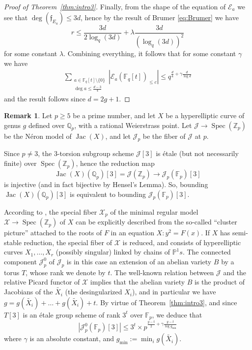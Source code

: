 \documentclass[11pt]{article}
\newcommand{\Z}{\ensuremath{\mathbb{Z}}}
\newcommand{\Q}{\ensuremath{\mathbb{Q}}}
\newcommand{\F}{\ensuremath{\mathbb{F}}}
\theoremstyle{plain}
\theoremstyle{definition}
\newtheorem{remark}[theorem]{Remark}
\DeclareMathOperator{\Spec}{Spec}
\DeclareMathOperator{\Jac}{Jac}
\newcommand{\PP}{\mathbb{P}}
\begin{document}
\begin{proof}[Proof of Theorem~\ref{thm:intro3}]
Finally, from the shape of the equation of $\mathcal{E}_a$ we see that $\deg(\mathfrak{f}_{E_a})\leq 3d$, hence by the result of Brumer \eqref{eq:Brumer} we have
$$
r\leq \frac{3d}{2\log_q(3d)}+ \lambda\frac{3d}{(\log_q (3d))^2}
$$
for some constant $\lambda$.
Combining everything, it follows that for some constant $\gamma$ we have
\begin{align*}
\sum_{\substack{a\in\mathbb{F}_q[t]\setminus\{0\}\\  \deg a\leq \frac{d-3}{4}}}    \left|\mathcal{E}_a(\mathbb{F}_q[t])_{\leq c}\right|
\leq q^{\frac{d}{4}+\gamma\frac{d}{\log d}}
\end{align*}
and the result follows since $d=2g+1$.
\end{proof}


\begin{remark}
\label{remark:Xbadred}
Let $p\geq 5$ be a prime number, and let $X$ be a hyperelliptic curve of genus $g$ defined over $\Q_p$, with a rational Weierstrass point. Let $\mathcal{J}\to\Spec(\Z_p)$ be the N\'eron model of $\Jac(X)$, and let $\mathcal{J}_p$ be the fiber of $\mathcal{J}$ at $p$.

Since $p\neq 3$, the $3$-torsion subgroup scheme $\mathcal{J}[3]$ is {\'e}tale (but not necessarily finite) over $\Spec(\Z_p)$, hence the reduction map
$$
\Jac(X)(\Q_p)[3]=\mathcal{J}(\Z_p) \to \mathcal{J}_p(\F_p)[3]
$$
is injective (and in fact bijective by Hensel's Lemma). So, bounding $\Jac(X)(\Q_p)[3]$ is equivalent to bounding $\mathcal{J}_p(\F_p)[3]$.

According to \cite{D2M2}, the special fiber $\mathcal{X}_p$ of the minimal regular model $\mathcal{X}\to \Spec(\Z_p)$ of $X$ can be explicitly described from the so-called ``cluster picture'' attached to the roots of $F$ in an equation $X:y^2=F(x)$. If $X$ has semi-stable reduction, the special fiber of $\mathcal{X}$ is reduced, and consists of hyperelliptic curves $X_1,\dots,X_r$ (possibly singular) linked by chains of $\PP^1s$. The connected component $\mathcal{J}_p^0$ of $\mathcal{J}_p$ is in this case an extension of an abelian variety $B$ by a torus $T$, whose rank we denote by $t$. The well-known relation \cite{raynaud70} between $\mathcal{J}$ and the relative Picard functor of $\mathcal{X}$ implies that the abelian variety $B$ is the product of Jacobians of the $\tilde{X_i}$ (the desingularized $X_i$), and in particular we have $g=g(\tilde{X_i})+\dots +g(\tilde{X_i})+t$. By virtue of Theorem~\ref{thm:intro3}, and since $T[3]$ is an {\'e}tale group scheme of rank $3^t$ over $\F_p$, we deduce that
$$
|\mathcal{J}_p^0(\F_p)[3]| \leq  3^t \times p^{\frac{g-t}{2}+\gamma\frac{g-t}{\log g_{\min}}}
$$
where $\gamma$ is an absolute constant, and $g_{\min}:=\min_i g(\tilde{X_i})$.


\end{remark}
\end{document}
